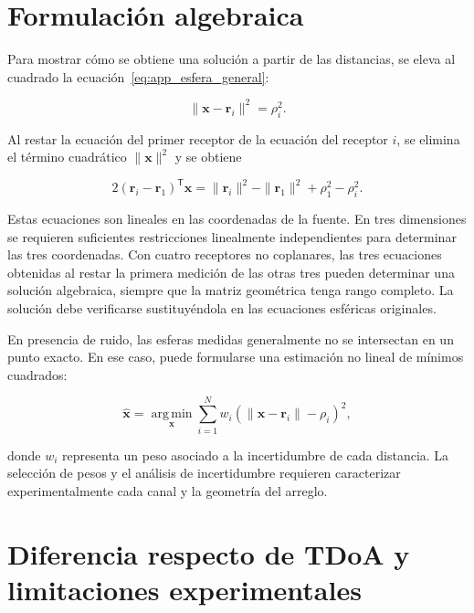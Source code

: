 \section{Formulación algebraica}

Para mostrar cómo se obtiene una solución a partir de las distancias,
se eleva al cuadrado la ecuación~\eqref{eq:app_esfera_general}:

\begin{equation}
    \|\mathbf{x}-\mathbf{r}_i\|^2=\rho_i^2.
\end{equation}

Al restar la ecuación del primer receptor de la ecuación del receptor
$i$, se elimina el término cuadrático $\|\mathbf{x}\|^2$ y se obtiene

\begin{equation}
    2(\mathbf{r}_i-\mathbf{r}_1)^\mathsf{T}\mathbf{x}
    =
    \|\mathbf{r}_i\|^2-\|\mathbf{r}_1\|^2
    +\rho_1^2-\rho_i^2.
    \label{eq:app_esfera_linealizada}
\end{equation}

Estas ecuaciones son lineales en las coordenadas de la fuente. En
tres dimensiones se requieren suficientes restricciones linealmente
independientes para determinar las tres coordenadas. Con cuatro
receptores no coplanares, las tres ecuaciones obtenidas al restar la
primera medición de las otras tres pueden determinar una solución
algebraica, siempre que la matriz geométrica tenga rango completo.
La solución debe verificarse sustituyéndola en las ecuaciones
esféricas originales.

En presencia de ruido, las esferas medidas generalmente no se
intersectan en un punto exacto. En ese caso, puede formularse una
estimación no lineal de mínimos cuadrados:

\begin{equation}
    \hat{\mathbf{x}}=
    \underset{\mathbf{x}}{\operatorname{arg\,min}}
    \sum_{i=1}^{N}w_i
    \left(
    \|\mathbf{x}-\mathbf{r}_i\|-\rho_i
    \right)^2,
    \label{eq:app_esfera_minimos_cuadrados}
\end{equation}

donde $w_i$ representa un peso asociado a la incertidumbre de cada
distancia. La selección de pesos y el análisis de incertidumbre
requieren caracterizar experimentalmente cada canal y la geometría
del arreglo.

\section{Diferencia respecto de TDoA y limitaciones experimentales}


